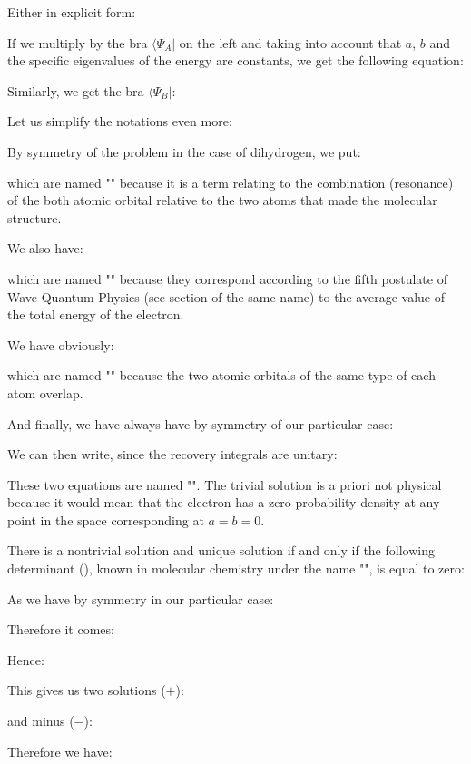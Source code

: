 	Either in explicit form:
	
	If we multiply by the bra $\langle \Psi_A|$  on the left and taking into account that $a$, $b$ and the specific eigenvalues of the energy are constants, we get the following equation:
	
	Similarly, we get the bra $\langle \Psi_B|$:
	
	Let us simplify the notations even more:
	
	By symmetry of the problem in the case of dihydrogen, we put:
	
	which are named "" because it is a term relating to the combination (resonance) of the both atomic orbital relative to the two atoms that made the molecular structure.

	We also have:
	
	which are named "" because they correspond according to the fifth postulate of Wave Quantum Physics (see section of the same name) to the average value of the total energy of the electron.

	We have obviously:
	
	which are named "" because the two atomic orbitals of the same type of each atom overlap.
	
	And finally, we have always have by symmetry of our particular case:
	
	We can then write, since the recovery integrals are unitary:
	
	These two equations are named "". The trivial solution is a priori not physical because it would mean that the electron has a zero probability density at any point in the space corresponding at $a=b=0$.

	There is a nontrivial solution and unique solution if and only if the following determinant (), known in molecular chemistry under the name "", is equal to zero:
	
	As we have by symmetry in our particular case:
	
	Therefore it comes:
	
	Hence:
	
	This gives us two solutions ($+$):
	
	and minus ($-$):
	
	Therefore we have:	
	
